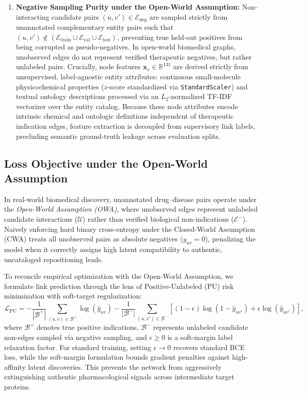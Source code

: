 \documentclass[conference,a4paper]{IEEEtran}
\begin{document}
\begin{enumerate}
    \item \textbf{Negative Sampling Purity under the Open-World Assumption:} Non-interacting candidate pairs $(u, v') \in \mathcal{E}_{\mathrm{neg}}$ are sampled strictly from unannotated complementary entity pairs such that $(u, v') \notin (\mathcal{E}_{\mathrm{train}} \cup \mathcal{E}_{\mathrm{val}} \cup \mathcal{E}_{\mathrm{test}})$, preventing true held-out positives from being corrupted as pseudo-negatives. In open-world biomedical graphs, unobserved edges do not represent verified therapeutic negatives, but rather unlabeled pairs. Crucially, node features $\mathbf{x}_v \in \mathbb{R}^{131}$ are derived strictly from unsupervised, label-agnostic entity attributes: continuous small-molecule physicochemical properties ($z$-score standardized via \texttt{StandardScaler}) and textual ontology descriptions processed via an $L_2$-normalized TF-IDF vectorizer over the entity catalog. Because these node attributes encode intrinsic chemical and ontologic definitions independent of therapeutic indication edges, feature extraction is decoupled from supervisory link labels, precluding semantic ground-truth leakage across evaluation splits.
\end{enumerate}

\subsection{Loss Objective under the Open-World Assumption}
In real-world biomedical discovery, unannotated drug--disease pairs operate under the \textit{Open-World Assumption (OWA)}, where unobserved edges represent unlabeled candidate interactions ($\mathcal{U}$) rather than verified biological non-indications ($\mathcal{E}^-$). Naively enforcing hard binary cross-entropy under the Closed-World Assumption (CWA) treats all unobserved pairs as absolute negatives ($y_{uv} = 0$), penalizing the model when it correctly assigns high latent compatibility to authentic, uncataloged repositioning leads.

To reconcile empirical optimization with the Open-World Assumption, we formulate link prediction through the lens of Positive-Unlabeled (PU) risk minimization with soft-target regularization:
\begin{equation}
    \mathcal{L}_{\mathrm{PU}} = -\frac{1}{|\mathcal{B}^+|} \sum_{(u,v) \in \mathcal{B}^+} \log(\hat{y}_{uv}) - \frac{1}{|\mathcal{B}^-|} \sum_{(u,v') \in \mathcal{B}^-} \left[ (1 - \epsilon) \log(1 - \hat{y}_{uv'}) + \epsilon \log(\hat{y}_{uv'}) \right],
    \label{eq:pu_loss}
\end{equation}
where $\mathcal{B}^+$ denotes true positive indications, $\mathcal{B}^-$ represents unlabeled candidate non-edges sampled via negative sampling, and $\epsilon \ge 0$ is a soft-margin label relaxation factor. For standard training, setting $\epsilon \to 0$ recovers standard BCE loss, while the soft-margin formulation bounds gradient penalties against high-affinity latent discoveries. This prevents the network from aggressively extinguishing authentic pharmacological signals across intermediate target proteins.
\end{document}
